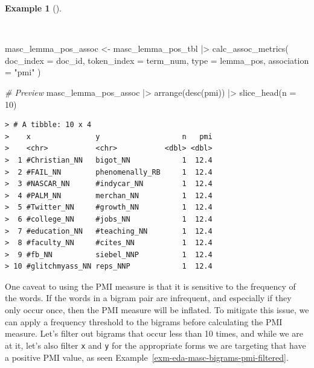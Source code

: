 \documentclass[
  letterpaper,
  DIV=11,
  numbers=noendperiod]{scrreprt}
\newenvironment{Shaded}{\begin{snugshade}}{\end{snugshade}}
\newcommand{\AttributeTok}[1]{\textcolor[rgb]{0.00,0.00,0.00}{#1}}
\newcommand{\CommentTok}[1]{\textcolor[rgb]{0.00,0.00,0.00}{\textit{#1}}}
\newcommand{\DecValTok}[1]{\textcolor[rgb]{0.00,0.00,0.00}{#1}}
\newcommand{\FunctionTok}[1]{\textcolor[rgb]{0.00,0.00,0.00}{#1}}
\newcommand{\NormalTok}[1]{\textcolor[rgb]{0.00,0.00,0.00}{#1}}
\newcommand{\OtherTok}[1]{\textcolor[rgb]{0.00,0.00,0.00}{#1}}
\newcommand{\SpecialCharTok}[1]{\textcolor[rgb]{0.00,0.00,0.00}{#1}}
\newcommand{\StringTok}[1]{\textcolor[rgb]{0.00,0.00,0.00}{#1}}
\theoremstyle{definition}
\newtheorem{example}{Example}[chapter]
\theoremstyle{remark}
\begin{document}
\begin{example}[]\protect\hypertarget{exm-eda-masc-bigrams-pmi}{}\label{exm-eda-masc-bigrams-pmi}

~

\begin{Shaded}
\begin{Highlighting}[]
\NormalTok{masc\_lemma\_pos\_assoc }\OtherTok{\textless{}{-}}
\NormalTok{  masc\_lemma\_pos\_tbl }\SpecialCharTok{|\textgreater{}}
  \FunctionTok{calc\_assoc\_metrics}\NormalTok{(}
    \AttributeTok{doc\_index =}\NormalTok{ doc\_id,}
    \AttributeTok{token\_index =}\NormalTok{ term\_num,}
    \AttributeTok{type =}\NormalTok{ lemma\_pos,}
    \AttributeTok{association =} \StringTok{"pmi"}
\NormalTok{  )}

\CommentTok{\# Preview}
\NormalTok{masc\_lemma\_pos\_assoc }\SpecialCharTok{|\textgreater{}}
  \FunctionTok{arrange}\NormalTok{(}\FunctionTok{desc}\NormalTok{(pmi)) }\SpecialCharTok{|\textgreater{}}
  \FunctionTok{slice\_head}\NormalTok{(}\AttributeTok{n =} \DecValTok{10}\NormalTok{)}
\end{Highlighting}
\end{Shaded}

\begin{verbatim}
> # A tibble: 10 x 4
>    x               y                   n   pmi
>    <chr>           <chr>           <dbl> <dbl>
>  1 #Christian_NN   bigot_NN            1  12.4
>  2 #FAIL_NN        phenomenally_RB     1  12.4
>  3 #NASCAR_NN      #indycar_NN         1  12.4
>  4 #PALM_NN        merchan_NN          1  12.4
>  5 #Twitter_NN     #growth_NN          1  12.4
>  6 #college_NN     #jobs_NN            1  12.4
>  7 #education_NN   #teaching_NN        1  12.4
>  8 #faculty_NN     #cites_NN           1  12.4
>  9 #fb_NN          siebel_NNP          1  12.4
> 10 #glitchmyass_NN reps_NNP            1  12.4
\end{verbatim}

\end{example}

One caveat to using the PMI measure is that it is sensitive to the
frequency of the words. If the words in a bigram pair are infrequent,
and especially if they only occur once, then the PMI measure will be
inflated. To mitigate this issue, we can apply a frequency threshold to
the bigrams before calculating the PMI measure. Let's filter out bigrams
that occur less than 10 times, and while we are at it, let's also filter
\texttt{x} and \texttt{y} for the appropriate forms we are targeting
that have a positive PMI value, as seen
Example~\ref{exm-eda-masc-bigrams-pmi-filtered}.
\end{document}

